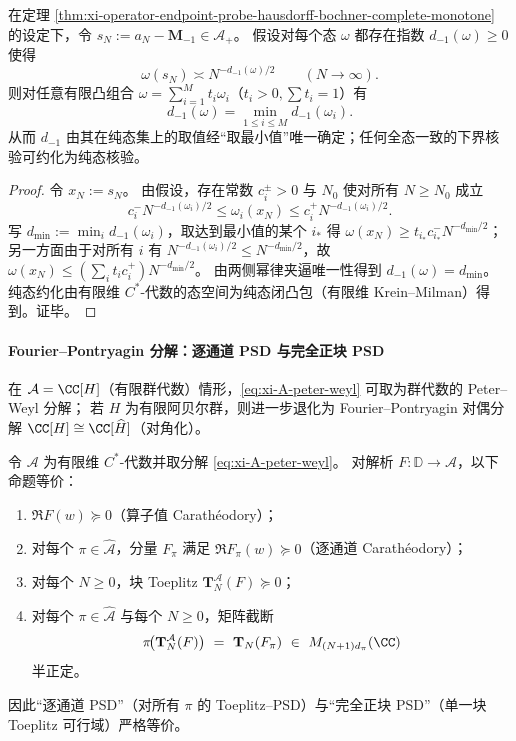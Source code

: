 \begin{proposition}[逐态谱维数的下包络规律]\label{prop:xi-statewise-endpoint-dimension-lower-envelope}
在定理 \ref{thm:xi-operator-endpoint-probe-hausdorff-bochner-complete-monotone} 的设定下，令 \(s_N:=a_N-\mathbf{M}_{-1}\in\mathcal{A}_+\)。
假设对每个态 \(\omega\) 都存在指数 \(d_{-1}(\omega)\ge 0\) 使得
\[
\omega(s_N)\asymp N^{-d_{-1}(\omega)/2}\qquad(N\to\infty).
\]
则对任意有限凸组合 \(\omega=\sum_{i=1}^{M}t_i\omega_i\)（\(t_i>0,\sum t_i=1\)）有
\[
\boxed{\;d_{-1}(\omega)=\min_{1\le i\le M}d_{-1}(\omega_i).\;}
\]
从而 \(d_{-1}\) 由其在纯态集上的取值经“取最小值”唯一确定；任何全态一致的下界核验可约化为纯态核验。
\end{proposition}
\begin{proof}
令 \(x_N:=s_N\)。
由假设，存在常数 \(c_i^\pm>0\) 与 \(N_0\) 使对所有 \(N\ge N_0\) 成立
\[
c_i^-N^{-d_{-1}(\omega_i)/2}\le \omega_i(x_N)\le c_i^+N^{-d_{-1}(\omega_i)/2}.
\]
写 \(d_{\min}:=\min_i d_{-1}(\omega_i)\)，取达到最小值的某个 \(i_\ast\) 得
\(
\omega(x_N)\ge t_{i_\ast}c_{i_\ast}^-N^{-d_{\min}/2}
\)；
另一方面由于对所有 \(i\) 有 \(N^{-d_{-1}(\omega_i)/2}\le N^{-d_{\min}/2}\)，故
\(
\omega(x_N)\le (\sum_i t_ic_i^+)N^{-d_{\min}/2}
\)。
由两侧幂律夹逼唯一性得到 \(d_{-1}(\omega)=d_{\min}\)。
纯态约化由有限维 \(C^\ast\)-代数的态空间为纯态闭凸包（有限维 Krein--Milman）得到。证毕。
\end{proof}

\paragraph{Fourier--Pontryagin 分解：逐通道 PSD 与完全正块 PSD}
在 \(\mathcal{A}=\CC[H]\)（有限群代数）情形，\eqref{eq:xi-A-peter-weyl} 可取为群代数的 Peter--Weyl 分解；
若 \(H\) 为有限阿贝尔群，则进一步退化为 Fourier--Pontryagin 对偶分解 \(\CC[H]\cong \CC[\widehat H]\)（对角化）。

\begin{theorem}\label{thm:xi-fourier-pontryagin-block-toeplitz}
令 \(\mathcal{A}\) 为有限维 \(C^\ast\)-代数并取分解 \eqref{eq:xi-A-peter-weyl}。
对解析 \(F:\mathbb{D}\to\mathcal{A}\)，以下命题等价：
\begin{enumerate}
  \item \(\Re F(w)\succeq 0\)（算子值 Carath\'eodory）；
  \item 对每个 \(\pi\in\widehat{\mathcal{A}}\)，分量 \(F_\pi\) 满足 \(\Re F_\pi(w)\succeq 0\)（逐通道 Carath\'eodory）；
  \item 对每个 \(N\ge 0\)，块 Toeplitz \(\mathbf{T}^{\mathcal{A}}_N(F)\succeq 0\)；
  \item 对每个 \(\pi\in\widehat{\mathcal{A}}\) 与每个 \(N\ge 0\)，矩阵截断
  \[
  \pi\!\bigl(\mathbf{T}^{\mathcal{A}}_N(F)\bigr)
  \ =\
  \mathbf{T}_N(F_\pi)\ \in\ M_{(N+1)d_\pi}(\CC)
  \]
  半正定。
\end{enumerate}
因此“逐通道 PSD”（对所有 \(\pi\) 的 Toeplitz--PSD）与“完全正块 PSD”（单一块 Toeplitz 可行域）严格等价。
\end{theorem}

